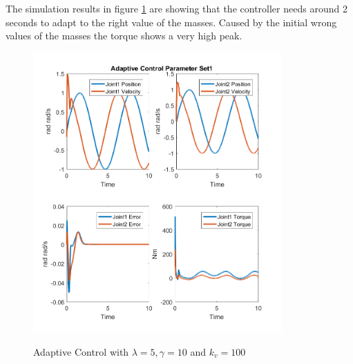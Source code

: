 The simulation results in figure \ref{fig:ch6_adap1} are showing that the controller needs around 2 seconds to adapt to the right value of the masses. Caused by the initial wrong values of the  masses the torque shows a very high peak.
\begin{figure}[]
	\centering
	\includegraphics[width=0.85\textwidth]{pics/AdaptiveControlParameterSet1.png}\\
	\caption{Adaptive Control with $\lambda = 5, \gamma=10 $ and $k_v = 100$ }
	\label{fig:ch6_adap1}
\end{figure}

